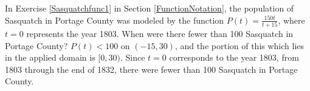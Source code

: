 {In Exercise \ref{Sasquatchfunc1} in Section \ref{FunctionNotation}, the population of Sasquatch in Portage County was modeled by the function $P(t) = \frac{150t}{t + 15}$, where $t = 0$ represents the year 1803.  When were there fewer than 100 Sasquatch in Portage County?}
{$P(t) < 100$ on $(-15, 30)$, and the portion of this which lies in the applied domain is $[0,30)$.  Since $t=0$ corresponds to the year 1803, from 1803 through the end of 1832, there were fewer than 100 Sasquatch in Portage County.
}